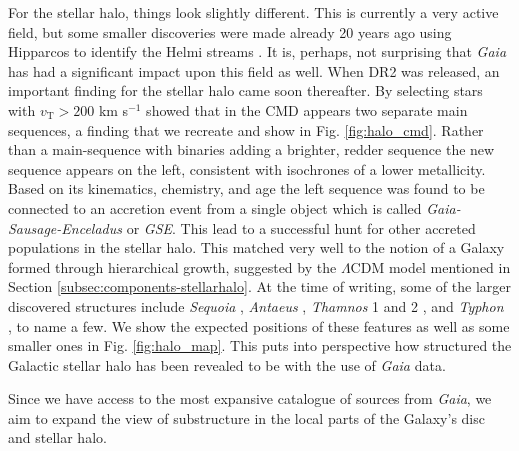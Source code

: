 For the stellar halo, things look slightly different. This is currently a very active field, but some smaller discoveries were made already 20 years ago using Hipparcos to identify the Helmi streams \citep{helmi:99}. It is, perhaps, not surprising that \textit{Gaia} has had a significant impact upon this field as well. When DR2 was released, an important finding for the stellar halo came soon thereafter. By selecting stars with $v_\mathrm{T} > 200$ km s$^{-1}$ \cite{dr2:hr} showed that in the CMD appears two separate main sequences, a finding that we recreate and show in Fig. \ref{fig:halo_cmd}. Rather than a main-sequence with binaries adding a brighter, redder sequence the new sequence appears on the left, consistent with isochrones of a lower metallicity. Based on its kinematics, chemistry, and age the left sequence was found to be connected to an accretion event from a single object \citep{belokurov:18, helmi:18} which is called \textit{Gaia-Sausage-Enceladus} or \textit{GSE}. This lead to a successful hunt for other accreted populations in the stellar halo. This matched very well to the notion of a Galaxy formed through hierarchical growth, suggested by the $\Lambda$CDM model mentioned in Section \ref{subsec:components-stellarhalo}. At the time of writing, some of the larger discovered structures include \textit{Sequoia} \citep{myeong:19}, \textit{Antaeus} \citep{oria:22}, \textit{Thamnos} 1 and 2 \citep{koppelman:19}, and \textit{Typhon} \citep{tenachi:22}, to name a few. We show the expected positions of these features as well as some smaller ones in Fig. \ref{fig:halo_map}. This puts into perspective how structured the Galactic stellar halo has been revealed to be with the use of \textit{Gaia} data.

Since we have access to the most expansive catalogue of sources from \textit{Gaia}, we aim to expand the view of substructure in the local parts of the Galaxy's disc and stellar halo.


